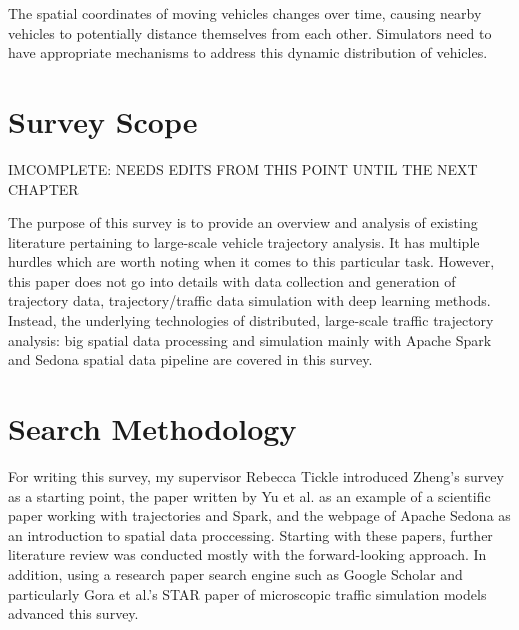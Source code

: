 \documentclass[11pt]{uonthesis}
\begin{document}
The spatial coordinates of moving vehicles changes over time, causing nearby vehicles to potentially distance themselves from each other. Simulators need to have appropriate mechanisms to address this dynamic distribution of vehicles. 

\section{Survey Scope}
IMCOMPLETE: NEEDS EDITS FROM THIS POINT UNTIL THE NEXT CHAPTER

The purpose of this survey is to provide an overview and analysis of existing literature pertaining to large-scale vehicle trajectory analysis. It has multiple hurdles which are worth noting when it comes to this particular task. However, this paper does not go into details with data collection and generation of trajectory data, trajectory/traffic data simulation with deep learning methods. Instead, the underlying technologies of distributed, large-scale traffic trajectory analysis: big spatial data processing and simulation mainly with Apache Spark and Sedona spatial data pipeline are covered in this survey.

\section{Search Methodology} 

For writing this survey, my supervisor Rebecca Tickle introduced Zheng's survey\cite{zheng2015trajectory} as a starting point, the paper written by Yu et al.\cite{yu2020dissecting} as an example of a scientific paper working with trajectories and Spark, and the webpage of Apache Sedona\cite{sedona} as an introduction to spatial data proccessing. Starting with these papers, further literature review was conducted mostly with the forward-looking approach. In addition, using a research paper search engine such as Google Scholar and particularly Gora et al.'s STAR paper of microscopic traffic simulation models\cite{gora2020microscopic} advanced this survey.
\end{document}
